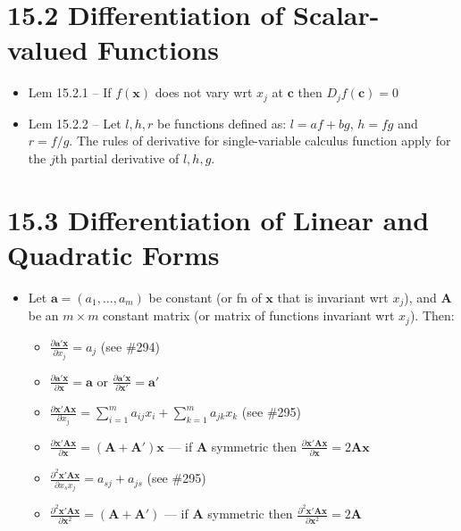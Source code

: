 \documentclass[a4paper]{article}
\newcommand{\mb}{\mathbf}
\begin{document}
\section*{15.2 Differentiation of Scalar-valued Functions}
\begin{itemize}
\setlength{\parindent}{0mm}
\item Lem 15.2.1 \--- If $f(\mathbf{x})$ does not vary wrt $x_j$ at $\mathbf{c}$ then $D_jf(\mathbf{c})=0$
\item Lem 15.2.2 \--- Let $l,h,r$ be functions defined as:
$l=af+bg$, $h=fg$ and $r=f/g$. The rules of derivative for single-variable calculus function apply for the $j$th partial derivative of $l,h,g$.
\end{itemize}
\section*{15.3 Differentiation of Linear and Quadratic Forms}
\begin{itemize}
\setlength{\parindent}{0mm}
\item Let $\mathbf{a}=(a_1,\hdots,a_m)$ be constant (or fn of $\mb{x}$ that is invariant wrt $x_j$), and $\mb{A}$ be an $m\times m$ constant matrix (or matrix of functions invariant wrt $x_j$). Then:
\begin{itemize}
\setlength{\parindent}{0mm}
\item $\frac{\partial  \mb{a'x}}{\partial x_j}=a_j$ (see \#294)
\item $\frac{\partial  \mb{a'x}}{\partial \mathbf{x}}=\mb{a}$ or $\frac{\partial  \mb{a'x}}{\partial \mathbf{x}'}=\mb{a}'$
\item $\frac{\partial \mb{x'Ax}}{\partial x_j} = \sum\limits_{i=1}^m a_{ij}x_i+\sum\limits_{k=1}^{m} a_{jk}x_k$ (see \#295)
\item $\frac{\partial \mb{x'Ax}}{\partial \mb{x}} = (\mathbf{A+A'})\mathbf{x}$ \---- if $\mb{A}$ symmetric then $\frac{\partial \mb{x'Ax}}{\partial \mb{x}} = 2\mathbf{Ax}$
\item $\frac{\partial^2 \mb{x'Ax}}{\partial x_s x_j} = a_{sj}+a_{js}$ (see \#295)
\item $\frac{\partial^2 \mb{x'Ax}}{\partial \mb{x}^2} = (\mathbf{A+A'})$ \---- if $\mb{A}$ symmetric then $\frac{\partial^2 \mb{x'Ax}}{\partial \mb{x}^2} = 2\mathbf{A}$
\end{itemize}

\end{itemize}
\clearpage
\newpage



\end{document}
